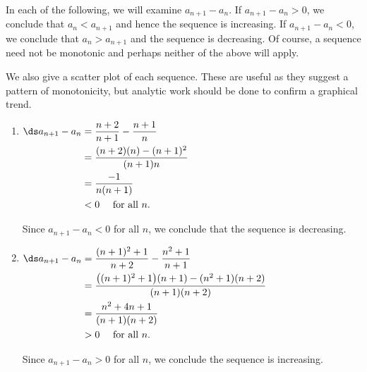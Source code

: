 {In each of the following, we will examine $a_{n+1}-a_n$. If $a_{n+1}-a_n >0$, we conclude that $a_n<a_{n+1}$ and hence the sequence is increasing. If $a_{n+1}-a_n<0$, we conclude that $a_n>a_{n+1}$ and the sequence is decreasing. Of course, a sequence need not be monotonic and perhaps neither of the above will apply.

We also give a scatter plot of each sequence. These are useful as they suggest a pattern of monotonicity, but analytic work should be done to confirm a graphical trend.

\begin{enumerate}
\item	\hfill	$\ds\begin{aligned}[t] a_{n+1}-a_n &= \frac{n+2}{n+1} - \frac{n+1}{n} \\		
					&= \frac{(n+2)(n)-(n+1)^2}{(n+1)n} \\
					&=	\frac{-1}{n(n+1)} \\
					&<0 \quad\text{ for all $n$.}
				\end{aligned}$ \hfill\null
				
Since $a_{n+1}-a_n<0$ for all $n$, we conclude that the sequence is decreasing.


\item		\hfill $\ds \begin{aligned}[t]	
						a_{n+1}-a_n &= \frac{(n+1)^2+1}{n+2} - \frac{n^2+1}{n+1} \\		
								&= \frac{\big((n+1)^2+1\big)(n+1)- (n^2+1)(n+2)}{(n+1)(n+2)}\\
								&=	\frac{n^2+4n+1}{(n+1)(n+2)} \\
								&> 0 \quad \text{ for all $n$.}
					\end{aligned}$\hfill \null
					
Since $a_{n+1}-a_n>0$ for all $n$, we conclude the sequence is increasing.
\drawexampleline


\end{enumerate}}

